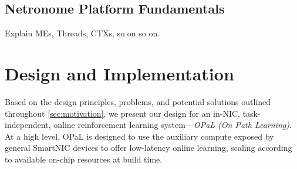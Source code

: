 \documentclass[sigconf,natbib=false]{acmart}
\newcommand{\approach}{On Path Learning}
\newcommand{\approachshort}{OPaL}
\begin{document}
\subsection{Netronome Platform Fundamentals}
Explain MEs, Threads, CTXs, so on so on.

\section{Design and Implementation}\label{sec:design}
Based on the design principles, problems, and potential solutions outlined throughout \cref{sec:motivation}, we present our design for an in-NIC, task-independent, online reinforcement learning system---\emph{\approachshort{} (\approach)}.
At a high level, \approachshort{} is designed to use the auxiliary compute exposed by general SmartNIC devices to offer low-latency online learning, scaling according to available on-chip resources at build time.
\end{document}
